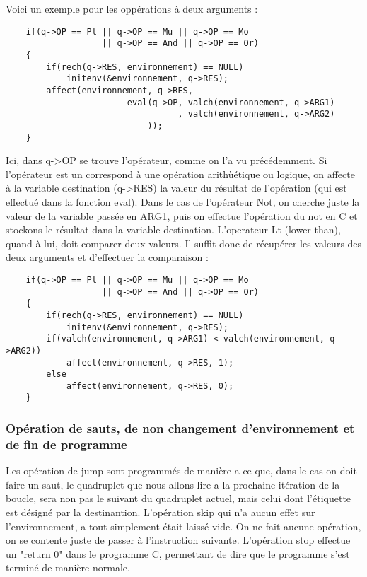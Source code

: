 \documentclass{article}
\begin{document}
Voici un exemple pour les oppérations à deux arguments :

\begin{lstlisting}
    if(q->OP == Pl || q->OP == Mu || q->OP == Mo
                   || q->OP == And || q->OP == Or)
    {
        if(rech(q->RES, environnement) == NULL)
            initenv(&environnement, q->RES);
        affect(environnement, q->RES,
                        eval(q->OP, valch(environnement, q->ARG1)
                                  , valch(environnement, q->ARG2)
                            ));
    }
\end{lstlisting}

Ici, dans q->OP se trouve l'opérateur, comme on l'a vu précédemment. Si l'opérateur est un correspond à une opération arithùétique ou logique, on affecte à la variable destination (q->RES) la valeur du résultat de l'opération (qui est effectué dans la fonction eval).
\medbreak
Dans le cas de l'opérateur Not, on cherche juste la valeur de la variable passée en ARG1, puis on effectue l'opération du not en C et stockons le résultat dans la variable destination.
\medbreak
L'operateur Lt (lower than), quand à lui, doit comparer deux valeurs. Il suffit donc de récupérer les valeurs des deux arguments et d'effectuer la comparaison :

\begin{lstlisting}
    if(q->OP == Pl || q->OP == Mu || q->OP == Mo
                   || q->OP == And || q->OP == Or)
    {
        if(rech(q->RES, environnement) == NULL)
            initenv(&environnement, q->RES);
        if(valch(environnement, q->ARG1) < valch(environnement, q->ARG2))
            affect(environnement, q->RES, 1);
        else
            affect(environnement, q->RES, 0);
    }
\end{lstlisting}


\subsubsection{Opération de sauts, de non changement d'environnement et de fin de programme}

Les opération de jump sont programmés de manière a ce que, dans le cas on doit faire un saut, le quadruplet que nous allons lire a la prochaine itération de la boucle, sera non pas le suivant du quadruplet actuel, mais celui dont l'étiquette est désigné par la destinantion.
\medbreak
L'opération skip qui n'a aucun effet sur l'environnement, a tout simplement était laissé vide. On ne fait aucune opération, on se contente juste de passer à l'instruction suivante.
\medbreak
L'opération stop effectue un "return 0" dans le programme C, permettant de dire que le programme s'est terminé de manière normale.
\end{document}
